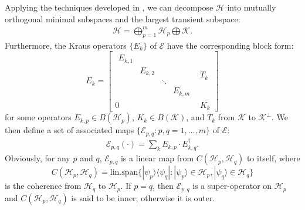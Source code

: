 \documentclass[journal]{IEEEtran}
\def\h{\ensuremath{\mathcal{H}}}
\def\k{\ensuremath{\mathcal{K}}}
\def\e{\ensuremath{\mathcal{E}}}
\def\k{\mathcal{K}}
\begin{document}
Applying the techniques developed in \cite{ying2013reachability,baumgartner2012structure}, we can decompose $\h$ into mutually orthogonal minimal subspaces and the largest transient subspace: 
\begin{eqnarray}\label{eq_mini_dec}
  \h=\bigoplus_{p=1}^m\h_p\bigoplus\k.
\end{eqnarray}
Furthermore, the Kraus operators $\{E_k\}$ of $\e$ have the  corresponding block form:
$$\renewcommand{\arraystretch}{1.2}
E_k=\left[\begin{array}{c|c}
  \begin{array}{cccc}
  E_{k,1} & & &\\
  & E_{k,2}  & &\\
  & & \ddots &\\
  & & & E_{k,m}  
  \end{array} & T_k\\
  \hline
0&K_k
\end{array}\right]$$
 for some operators $E_{k,p}\in B(\h_p)$, $K_k\in B(\k)$, and $T_k$ from $\k$ to $\k^\perp$. 
We then define a set of associated maps $\{\e_{p,q} : p,q = 1, \dots, m\}$ of $\e$:
\begin{eqnarray}\label{Eq_ass_maps}
  \e_{p,q}(\cdot)=\sum_{k} E_{k,p}\cdot E_{k,q}^\dagger.
\end{eqnarray}
Obviously, for any $p$ and $q$, $\e_{p,q}$ is a linear  map from $C(\h_p,\h_q)$ to itself, where 
\[
	C(\h_p,\h_q)=\textrm{lin.span}\{|\psi_{p}\rangle\langle\psi_q | : |\psi_{p}\rangle\in \h_{p}, |\psi_{q}\rangle\in \h_{q}\}
\]
is the coherence from $\h_q$ to $\h_p$. If $p=q$, then $\e_{p,q}$ is a super-operator on $\h_p$ and $C(\h_p,\h_q)$  is said to be inner; otherwise it is outer. 
\end{document}

